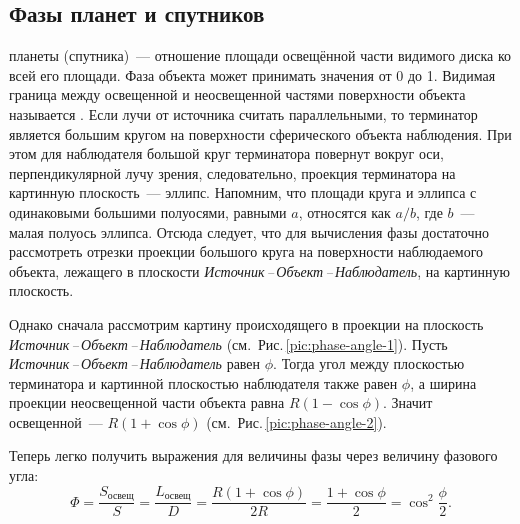 \subsection{Фазы планет и спутников}

 планеты (спутника)~--- отношение площади освещённой  части видимого диска ко всей его площади. Фаза объекта может принимать значения от 0 до 1. Видимая граница между освещенной и неосвещенной частями поверхности объекта называется . Если лучи от источника считать параллельными, то терминатор является большим кругом на поверхности сферического объекта наблюдения. При этом для наблюдателя большой круг терминатора повернут вокруг оси, перпендикулярной лучу зрения, следовательно, проекция терминатора на картинную плоскость~--- эллипс. Напомним, что площади круга и эллипса с одинаковыми большими полуосями, равными $a$, относятся как $a/b$, где $b$~--- малая полуось эллипса. Отсюда следует, что для вычисления фазы достаточно рассмотреть отрезки проекции большого круга на поверхности наблюдаемого объекта, лежащего в плоскости {\slshape Источник\,--\,Объект\,--\,Наблюдатель}, на картинную плоскость.


Однако сначала рассмотрим картину происходящего в проекции на плоскость {\slshape Источник\,--\,Объект\,--\,Наблюдатель} (см.~Рис.\,\ref{pic:phase-angle-1}). Пусть  {\slshape Источник\,--\,Объект\,--\,Наблюдатель} равен $\phi$. Тогда угол между плоскостью терминатора и картинной плоскостью наблюдателя также равен $\phi$, а ширина проекции неосвещенной части объекта равна $R(1 - \cos \phi)$. Значит освещенной~--- $R( 1+ \cos \phi)$ (см.~Рис.\,\ref{pic:phase-angle-2}).

Теперь легко получить выражения для величины фазы через величину фазового угла:
\begin{equation}
	\Phi = \frac{S_\text{освещ}}{S} = \frac{L_\text{освещ}}{D} = \frac{R ( 1 + \cos \phi )}{2R} = \frac{1 + \cos \phi}{2} =  \cos^2 \frac{\phi}{2}.
\end{equation}

